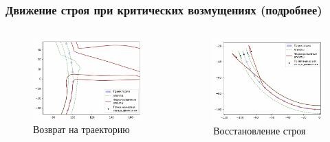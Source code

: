 \documentclass[10pt]{beamer}
\begin{document}
\begin{frame}
	\frametitle{Движение строя при критических возмущениях (подробнее)}
	\begin{columns}
			\begin{figure}
				\centering
				\includegraphics[width=1\linewidth]{platoon/with-bird-zoom1}
				\caption{Возврат на траекторию}
				\label{fig:with-bird-zoom1}
			\end{figure}
			\begin{figure}
				\centering
				\includegraphics[width=1\linewidth]{platoon/with-bird-zoom2}
				\caption{Восстановление строя}
				\label{fig:with-bird-zoom2}
			\end{figure}
	\end{columns}
\end{frame}
\end{document}
